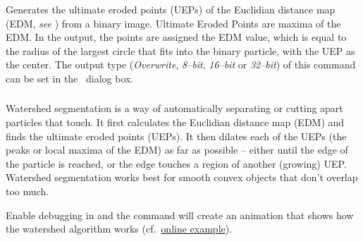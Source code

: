 \subsubsection[\protect\userinterface{Ultimate Points}]{\protect{}\label{sub:Ultimate-Points}}

Generates the ultimate eroded points (UEPs)
of the Euclidian distance map (EDM, \emph{see} )
from a binary image. Ultimate Eroded Points are maxima of the EDM.
In the output, the points are assigned the EDM value, which is equal
to the radius of the largest circle that fits into the binary particle,
with the UEP as the center. The output type (\emph{Overwrite}, \emph{8--bit},
\emph{16--bit} or \emph{32--bit}) of this command can be set in the
\ dialog
box.


\subsubsection{\protect{}\label{sub:Watershed}}

Watershed segmentation is a way of automatically
separating or cutting apart particles that touch. It first calculates
the Euclidian distance map (EDM) and
finds the ultimate eroded points (UEPs). It then dilates each of the
UEPs (the peaks or local maxima of the EDM) as far as possible --
either until the edge of the particle is reached, or the edge touches
a region of another (growing) UEP. Watershed segmentation works best
for smooth convex objects that don't overlap too much.

Enable debugging in 
and the  command will create an animation
that shows how the watershed algorithm works (cf.\ \href{http://imagej.nih.gov/ij/images/watershed-animation.gif}{online example}).



